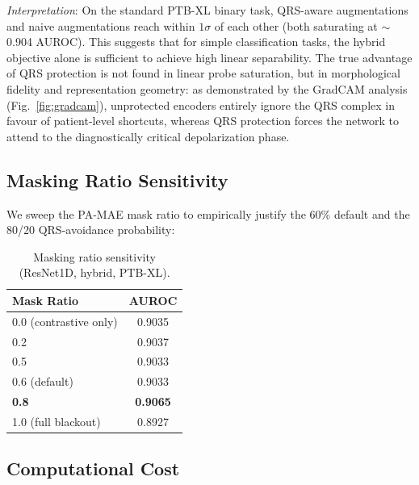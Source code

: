 \documentclass[journal,10pt]{IEEEtran}
\newcommand{\figref}[1]{Fig.~\ref{#1}}
\begin{document}
\noindent\textit{Interpretation}: On the standard PTB-XL binary task, QRS-aware augmentations and naive augmentations reach within $1\sigma$ of each other (both saturating at $\sim$0.904 AUROC). This suggests that for simple classification tasks, the hybrid objective alone is sufficient to achieve high linear separability. The true advantage of QRS protection is not found in linear probe saturation, but in morphological fidelity and representation geometry: as demonstrated by the GradCAM analysis (\figref{fig:gradcam}), unprotected encoders entirely ignore the QRS complex in favour of patient-level shortcuts, whereas QRS protection forces the network to attend to the diagnostically critical depolarization phase.

\subsection{Masking Ratio Sensitivity}

We sweep the PA-MAE mask ratio to empirically justify the 60\% default and the 80/20 QRS-avoidance probability:

\begin{table}[h]
\centering
\caption{Masking ratio sensitivity (ResNet1D, hybrid, PTB-XL).}
\label{tab:mask_sweep}
\begin{tabular}{lc}
\toprule
\textbf{Mask Ratio} & \textbf{AUROC} \\
\midrule
0.0 (contrastive only) & 0.9035 \\
0.2 & 0.9037 \\
0.5 & 0.9033 \\
0.6 (default) & 0.9033 \\
\textbf{0.8} & \textbf{0.9065} \\
1.0 (full blackout) & 0.8927 \\
\bottomrule
\end{tabular}
\end{table}



\subsection{Computational Cost}

\begin{table}[h]
\centering
\caption{Computational comparison of encoder architectures (batch=128, NVIDIA A100 GPU, 1000 forward passes).}
\label{tab:compute}
\end{table}
\end{document}
